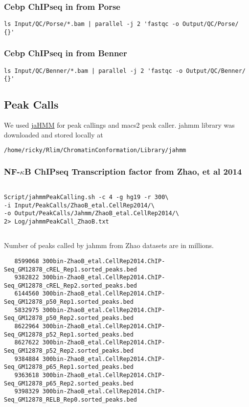 \documentclass{article}\usepackage[]{graphicx}\usepackage[]{color}
\begin{document}
\subsubsection{Cebp ChIPseq in from Porse}
\begin{verbatim}
ls Input/QC/Porse/*.bam | parallel -j 2 'fastqc -o Output/QC/Porse/ {}'
\end{verbatim}

\subsubsection{Cebp ChIPseq in from Benner}
\begin{verbatim}
ls Input/QC/Benner/*.bam | parallel -j 2 'fastqc -o Output/QC/Benner/ {}'
\end{verbatim}

\subsection{Peak Calls}
We used \href{https://github.com/gui11aume/zerone/tree/master/doc}{jaHMM} for peak callings and macs2 peak caller.
jahmm library was downloaded and stored locally at 

\verb|/home/ricky/Rlim/ChromatinConformation/Library/jahmm|

\subsubsection{NF-$\kappa$B ChIPseq Transcription factor from Zhao, et al 2014}
\begin{verbatim}

Script/jahmmPeakCalling.sh -c 4 -g hg19 -r 300\ 
-i Input/PeakCalls/ZhaoB_etal.CellRep2014/\ 
-o Output/PeakCalls/Jahmm/ZhaoB_etal.CellRep2014/\ 
2> Log/jahmmPeakCall_ZhaoB.txt 


\end{verbatim}

Number of peaks called by jahmm from Zhao datasets are in millions. 
\begin{verbatim}
   8599068 300bin-ZhaoB_etal.CellRep2014.ChIP-Seq_GM12878_cREL_Rep1.sorted_peaks.bed
   9382822 300bin-ZhaoB_etal.CellRep2014.ChIP-Seq_GM12878_cREL_Rep2.sorted_peaks.bed
   6144560 300bin-ZhaoB_etal.CellRep2014.ChIP-Seq_GM12878_p50_Rep1.sorted_peaks.bed
   5832975 300bin-ZhaoB_etal.CellRep2014.ChIP-Seq_GM12878_p50_Rep2.sorted_peaks.bed
   8622964 300bin-ZhaoB_etal.CellRep2014.ChIP-Seq_GM12878_p52_Rep1.sorted_peaks.bed
   8627622 300bin-ZhaoB_etal.CellRep2014.ChIP-Seq_GM12878_p52_Rep2.sorted_peaks.bed
   9384884 300bin-ZhaoB_etal.CellRep2014.ChIP-Seq_GM12878_p65_Rep1.sorted_peaks.bed
   9363618 300bin-ZhaoB_etal.CellRep2014.ChIP-Seq_GM12878_p65_Rep2.sorted_peaks.bed
   9398329 300bin-ZhaoB_etal.CellRep2014.ChIP-Seq_GM12878_RELB_Rep0.sorted_peaks.bed
\end{verbatim}
\end{document}
